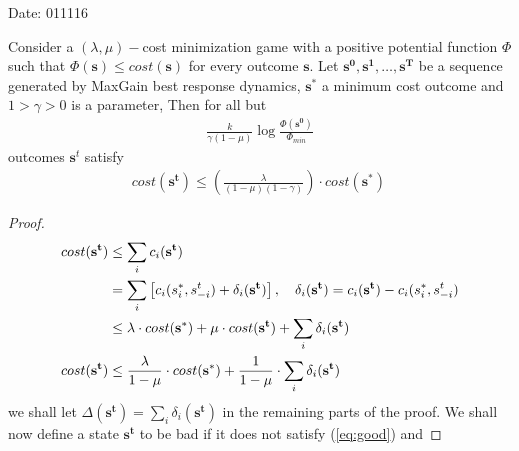 
\begin{flushright}
Date: 011116
\end{flushright}

\begin{thm}
Consider a $(\lambda,\mu)-$cost minimization game with a positive potential function $\Phi$ such that $\Phi(\mathbf{s}) \leq cost(\mathbf{s})$ for every outcome $\mathbf{s}$. Let $\mathbf{s^0},\mathbf{s^1},\ldots,\mathbf{s^T}$ be a sequence generated by MaxGain best response dynamics, $\mathbf{s^\ast}$ a minimum cost outcome and $1>\gamma>0$ is a parameter, Then for all but 
\begin{align}
\frac{k}{\gamma(1-\mu)}\log\frac{\Phi(\mathbf{s^0})}{\Phi_{min}}\label{eq:outcomes}
\end{align}
outcomes $\mathbf{s}^t$ satisfy
\begin{align}
cost(\mathbf{s^t})\leq \left(\frac{\lambda}{(1-\mu)(1-\gamma)}\right)\cdot cost(\mathbf{s^\ast})\, \label{eq:good}
\end{align}
\begin{proof}
\begin{align}
cost(\mathbf{s^t})&\leq \sum_i c_i(\mathbf{s^t})\notag\\
&=\sum_i\left[c_i(s_i^\ast,s_{-i}^t)+\delta_i(\mathbf{s^t})\right],\quad \delta_i(\mathbf{s^t})=c_i(\mathbf{s^t})-c_i(s_i^\ast,s^t_{-i})\notag\\
&\leq \lambda \cdot cost(\mathbf{s^\ast})+\mu \cdot cost(\mathbf{s^t})+\sum_i\delta_i(\mathbf{s^t})\notag\\
cost(\mathbf{s^t})&\leq \frac{\lambda}{1-\mu}\cdot cost(\mathbf{s^\ast}) + \frac{1}{1-\mu}\cdot \sum_i\delta_i(\mathbf{s^t}) \label{eq:2}
\end{align}
we shall let $\Delta(\mathbf{s^t})=\sum_i\delta_i(\mathbf{s^t})$ in the remaining parts of the proof. We shall now define a state $\mathbf{s^t}$ to be bad if it does not satisfy (\ref{eq:good}) and 

\end{proof}
\end{thm}
